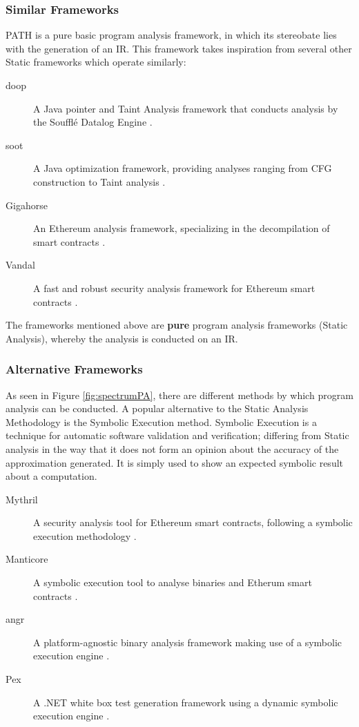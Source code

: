             \subsubsection*{Similar Frameworks}
            \par \acs{PATH} is a pure basic program analysis framework, in which its stereobate lies with the generation of an \acs{IR}. This framework takes inspiration from several other
            Static frameworks which operate similarly:
            \begin{description}
                \item[doop]A Java pointer and Taint Analysis framework that conducts analysis by the Soufflé Datalog Engine \cite[]{bravenboer2009strictly}.
                \item[soot]A Java optimization framework, providing analyses ranging from \acs{CFG} construction to Taint analysis \cite[]{vallee2010soot}.
                \item[Gigahorse]An Ethereum analysis framework, specializing in the decompilation of smart contracts \cite[]{grech2019gigahorse}.
                \item[Vandal]A fast and robust security analysis framework for Ethereum smart contracts \cite[]{brent2018vandal}.
            \end{description}
            \par The frameworks mentioned above are {\bfseries pure} program analysis frameworks (Static Analysis), whereby the analysis is conducted on an \acs{IR}.
            
            \subsubsection*{Alternative Frameworks}
            \par As seen in Figure \ref{fig:spectrumPA}, there are different methods by which program analysis can be conducted. A popular alternative to the Static Analysis Methodology is the Symbolic Execution method.
            Symbolic Execution is a technique for automatic software validation and verification; differing from Static analysis in the way that it does not form an opinion about the accuracy of the approximation generated. It is simply used to show an expected symbolic result about a computation.
            \begin{description}
                \item[Mythril] A security analysis tool for Ethereum smart contracts, following a symbolic execution methodology \cite[]{di2019survey}.
                \item[Manticore] A symbolic execution tool to analyse binaries and Etherum smart contracts \cite[]{mossberg2019manticore}. 
                \item[angr] A platform-agnostic binary analysis framework making use of a symbolic execution engine \cite[]{wang2017angr}.
                \item[Pex] A .NET white box test generation framework using a dynamic symbolic execution engine \cite[]{tillmann2008pex}.
            \end{description}


